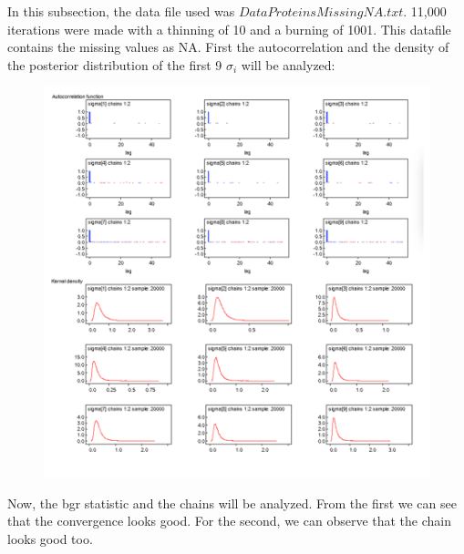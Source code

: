 \documentclass{article}
\begin{document}
In this subsection, the data file used was $DataProteinsMissingNA.txt$. 11,000 iterations were made with a thinning of 10 and a burning of 1001. This datafile contains the missing values as NA. First the autocorrelation and the density of the posterior distribution of the first 9 $\sigma_i$ will be analyzed:

\begin{figure}[ht!]
\centering
\includegraphics[width=16cm]{figures/model5_sigma.png}
\end{figure}


\newpage

Now, the bgr statistic and the chains will be analyzed. From the first we can see that the convergence looks good. For the second, we can observe that the chain looks good too.
\end{document}
